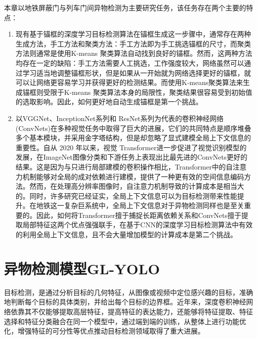 本章以地铁屏蔽门与列车门间异物检测为主要研究任务，该任务存在两个主要的特点：
\begin{enumerate}[topsep = 0 pt, itemsep= 0 pt, parsep=0pt, partopsep=0pt, leftmargin=44pt, itemindent=0pt, labelsep=6pt, label=(\arabic*)]
	\item 现有基于锚框的深度学习目标检测算法在锚框生成这一步骤中，通常存在两种生成方法，手工方法和聚类方法：手工方法即为手工挑选锚框的尺寸，而聚类方法则通常是使用K-means 聚类算法自动找到良好的锚框。然而，这两种方法均存在一定的缺陷：手工方法需要人工挑选，工作强度较大，网络虽然可以通过学习适当地调整锚框形状，但是如果从一开始就为网络选择更好的锚框，就可以让网络更容易学习并获得更好的检测结果。而使用K-means聚类算法来生成锚框则受限于K-means 聚类算法本身的局限性，聚类结果很容易受到初始值的选取影响。因此，如何更好地自动生成锚框是第一个挑战。
	
	\item 以VGGNet\cite{vggnet}、InceptionNet系列\cite{Inceptionv1,Inceptionv2,Inceptionv4}和 ResNet系列\cite{resnetv1,resnetv2,resnetv3}为代表的卷积神经网络 (ConvNets)在多种视觉任务中取得了巨大的进展，它们的共同特点是顺序堆叠多个基本模块，并采用金字塔结构，但是却忽略了显式建模全局上下文信息的重要性。自从 2020 年以来，视觉 Transformer\cite{ViT,detr,Deformable-detr}进一步促进了视觉识别模型的发展，在ImageNet图像分类和下游任务上表现出比最先进的ConvNets更好的结果。这是因为与只进行局部建模的卷积操作相比，Transformer中的自注意力机制能够对全局的成对依赖进行建模，提供了一种更有效的空间信息编码方法。然而，在处理高分辨率图像时，自注意力机制导致的计算成本是相当大的。同时，许多研究\cite{Inside-OutsideNet,Combining-Multiple-Sensors-for-Event-Detection-of-Older-People,Attentive-Contexts-for-Object-Detection}已经证实，全局上下文信息可以为目标检测带来性能提升。在地铁这一复杂巨系统中，全局上下文信息对于异物检测同样也是至关重要的。因此，如何将Transformer擅于捕捉长距离依赖关系和ConvNets擅于提取局部特征这两个优点强强联手，在基于CNN的深度学习目标检测算法中有效的利用全局上下文信息，且不会大量增加模型的计算成本是第二个挑战。
\end{enumerate}

\section{异物检测模型GL-YOLO}
目标检测，是通过分析目标的几何特征，从图像或视频中定位感兴趣的目标，准确地判断每个目标的具体类别，并给出每个目标的边界框。近年来，深度卷积神经网络依靠其不仅能够提取高层特征，提高特征的表达能力，还能够将特征提取、特征选择和特征分类融合在同一个模型中，通过端到端的训练，从整体上进行功能优化，增强特征的可分性等优点推动目标检测领域取得了重大进展。

